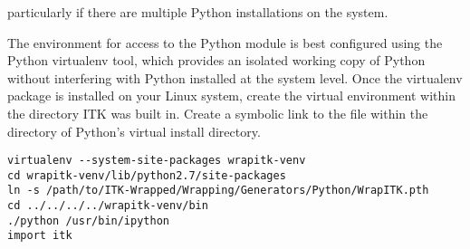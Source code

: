particularly if there are multiple Python installations on the system.

The environment for access to the  Python module is best configured
using the Python virtualenv tool, which provides an isolated working copy of Python
without interfering with Python installed at the system level. Once the virtualenv
package is installed on your Linux system, create the virtual environment within the
directory ITK was built in. Create a symbolic link to the  file
within the  directory of Python's virtual install
directory.

\small
\begin{verbatim}
virtualenv --system-site-packages wrapitk-venv
cd wrapitk-venv/lib/python2.7/site-packages
ln -s /path/to/ITK-Wrapped/Wrapping/Generators/Python/WrapITK.pth
cd ../../../../wrapitk-venv/bin
./python /usr/bin/ipython
import itk
\end{verbatim}
\normalsize

